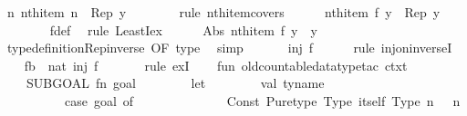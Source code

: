 \begin{isabellebody}
\ {\isachardoublequoteopen}{\isasymexists}n{\isachardot}\ nth{\isacharunderscore}item\ n\ {\isacharequal}\ Rep\ y{\isachardoublequoteclose}\isanewline
\ \ \ \ \ \ \isamarkupfalse%
\ {\isacharparenleft}rule\ nth{\isacharunderscore}item{\isacharunderscore}covers{\isacharparenright}\isanewline
\ \ \ \ \isamarkupfalse%
\ {\isachardoublequoteopen}nth{\isacharunderscore}item\ {\isacharparenleft}f\ y{\isacharparenright}\ {\isacharequal}\ Rep\ y{\isachardoublequoteclose}\isanewline
\ \ \ \ \ \ \isamarkupfalse%
\ f{\isacharunderscore}def\ \isamarkupfalse%
\ {\isacharparenleft}rule\ LeastI{\isacharunderscore}ex{\isacharparenright}\isanewline
\ \ \ \ \isamarkupfalse%
\ {\isachardoublequoteopen}Abs\ {\isacharparenleft}nth{\isacharunderscore}item\ {\isacharparenleft}f\ y{\isacharparenright}{\isacharparenright}\ {\isacharequal}\ y{\isachardoublequoteclose}\isanewline
\ \ \ \ \ \ \isamarkupfalse%
\ type{\isacharunderscore}definition{\isachardot}Rep{\isacharunderscore}inverse\ {\isacharbrackleft}OF\ type{\isacharbrackright}\ \isamarkupfalse%
\ simp\isanewline
\ \ \isacommand{{\isacharbraceright}}\isamarkupfalse%
\isanewline
\ \ \isamarkupfalse%
\ {\isachardoublequoteopen}inj\ f{\isachardoublequoteclose}\isanewline
\ \ \ \ \isamarkupfalse%
\ {\isacharparenleft}rule\ inj{\isacharunderscore}on{\isacharunderscore}inverseI{\isacharparenright}\isanewline
\ \ \isamarkupfalse%
\ {\isachardoublequoteopen}{\isasymexists}f{\isacharcolon}{\isacharcolon}{\isacharprime}b\ {\isasymRightarrow}\ nat{\isachardot}\ inj\ f{\isachardoublequoteclose}\isanewline
\ \ \ \ \isamarkupfalse%
\ {\isacharminus}\ {\isacharparenleft}rule\ exI{\isacharparenright}\isanewline
{}\isamarkupfalse%
%
\endisatagproof
{\isafoldproof}%
%
\isadelimproof
\isanewline
%
\endisadelimproof
%
\isadelimML
\isanewline
%
\endisadelimML
%
\isatagML
{}\isamarkupfalse%
\ {\isacartoucheopen}\isanewline
\ \ fun\ old{\isacharunderscore}countable{\isacharunderscore}datatype{\isacharunderscore}tac\ ctxt\ {\isacharequal}\isanewline
\ \ \ \ SUBGOAL\ {\isacharparenleft}fn\ {\isacharparenleft}goal{\isacharcomma}\ {\isacharunderscore}{\isacharparenright}\ {\isacharequal}{\isachargreater}\isanewline
\ \ \ \ \ \ let\isanewline
\ \ \ \ \ \ \ \ val\ ty{\isacharunderscore}name\ {\isacharequal}\isanewline
\ \ \ \ \ \ \ \ \ \ {\isacharparenleft}case\ goal\ of\isanewline
\ \ \ \ \ \ \ \ \ \ \ \ {\isacharparenleft}{\isacharunderscore}\ {\isachardollar}\ Const\ {\isacharparenleft}\isactrlconstUNDERSCOREname {\isasymopen}Pure{\isachardot}type{\isasymclose}{\isacharcomma}\ Type\ {\isacharparenleft}\isactrltypeUNDERSCOREname {\isasymopen}itself{\isasymclose}{\isacharcomma}\ {\isacharbrackleft}Type\ {\isacharparenleft}n{\isacharcomma}\ {\isacharunderscore}{\isacharparenright}{\isacharbrackright}{\isacharparenright}{\isacharparenright}{\isacharparenright}\ {\isacharequal}{\isachargreater}\ n\isanewline

\end{isabellebody}
